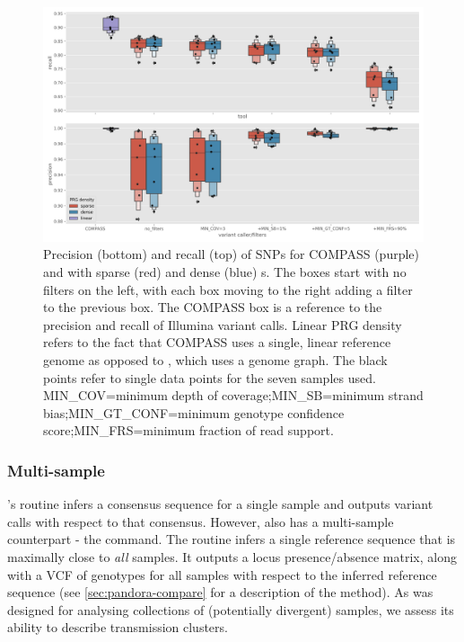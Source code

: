 \begin{figure}
\begin{center}
\includegraphics[width=0.90\columnwidth]{Chapter2/Figs/pandora-precision-recall-filters-snps.png}
\caption{{Precision (bottom) and recall (top) of SNPs for COMPASS (purple) and \pandora{} with sparse (red) and dense (blue) \panrg{}s. The \pandora{} boxes start with no filters on the left, with each box moving to the right adding a filter to the previous box. The COMPASS box is a reference to the precision and recall of Illumina variant calls. Linear PRG density refers to the fact that COMPASS uses a single, linear reference genome as opposed to \pandora{}, which uses a genome graph. The black points refer to single data points for the seven samples used. MIN\_COV=minimum depth of coverage;MIN\_SB=minimum strand bias;MIN\_GT\_CONF=minimum genotype confidence score;MIN\_FRS=minimum fraction of read support.
{\label{fig:pandora-filters-snps}}%
}}
\end{center}
\end{figure}

\subsubsection{Multi-sample}

\pandora{}'s  routine infers a consensus sequence for a single sample and outputs variant calls with respect to that consensus. However, \pandora{} also has a multi-sample counterpart - the  command. The \compare{} routine infers a single reference sequence that is maximally close to \emph{all} samples. It outputs a locus presence/absence matrix, along with a VCF of genotypes for all samples with respect to the inferred reference sequence (see \autoref{sec:pandora-compare} for a description of the \compare{} method). As \compare{} was designed for analysing collections of (potentially divergent) samples, we assess its ability to describe \mtb{} transmission clusters. 

